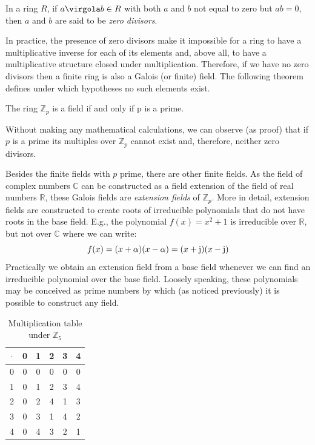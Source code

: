 \begin{Def}
In a ring $R$, if \(a \virgola b \in R\) with both $a$ and $b$ not equal to zero but \(ab = 0\), then $a$ and $b$ are said to be \emph{zero divisors}.
\end{Def}
In practice, the presence of zero divisors make it impossible for a ring to have a multiplicative inverse for each of its elements and, above all, to have a multiplicative structure closed under multiplication. Therefore, if we have no zero divisors then a finite ring is also a Galois (or finite) field. The following theorem defines under which hypotheses no such elements exist.

\begin{Theorem}
The ring \( \mathbb Z_p\) is a field if and only if p is a prime.   \label{th:subgf}
\end{Theorem}
Without making any mathematical calculations, we can observe (as proof) that if $p$ is a prime its multiples over \( \mathbb Z_p\) cannot exist and, therefore, neither zero divisors.

Besides the finite fields with $p$ prime, there are other finite fields. As the field of complex numbers \( \mathbb C\) can be constructed as a field extension of the field of real numbers \(\mathbb R\), these Galois fields are \emph{extension fields} of \( \mathbb Z_p\). More in detail, extension fields are constructed to create roots of irreducible polynomials that do not have roots in the base field. E.g., the  polynomial \(f(x) = x^2+1\) is irreducible over \(\mathbb R\), but not over \(\mathbb C\) where we can write:
\begin{equation}
f(x)=(x+\alpha)(x-\alpha)=(x+\operatorname{\mathrm{j\mathstrut}})(x-\operatorname{\mathrm{j\mathstrut}})
\end{equation}
Practically we obtain an extension field from a base field whenever we can find an irreducible polynomial over the base field. Loosely speaking, these polynomials may be conceived as prime numbers by which (as noticed previously) it is possible to construct any field.

\begin{table}\centering
\begin{tabular}{c| c c c c c}
$\cdot$ & 0 & 1 & 2 & 3 & 4\\
\hline
0 & 0 & 0 & 0 & 0 & 0\\
1 & 0 & 1 & 2 & 3 & 4\\
2 & 0 & 2 & 4 & 1 & 3\\
3 & 0 & 3 & 1 & 4 & 2\\
4 & 0 & 4 & 3 & 2 & 1 \\
\end{tabular}
\caption{Multiplication table under \( \mathbb Z_5\)} \label{tb:Fieldmod5}
\end{table}


